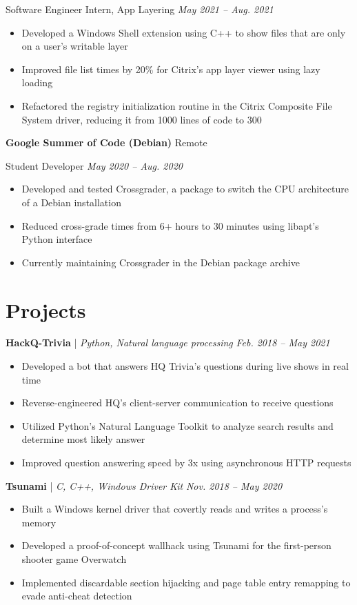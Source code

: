 \documentclass[11pt,letterpaper]{article}
\newcommand{\resumeItemListStart}{
    \begin{itemize}[itemsep=1pt, parsep=0pt, topsep=0pt]
}
\newcommand{\resumeItemListEnd}{
    \end{itemize}
}
\begin{document}
Software Engineer Intern, App Layering \hfill \textit{May 2021 -- Aug. 2021}

\resumeItemListStart
	\item Developed a Windows Shell extension using C++ to show files that are only on a user's writable layer
	\item Improved file list times by 20\% for Citrix's app layer viewer using lazy loading
	\item Refactored the registry initialization routine in the Citrix Composite File System driver, reducing it from 1000 lines of code to 300
\resumeItemListEnd

\textbf{Google Summer of Code (Debian)} \hfill Remote

Student Developer \hfill \textit{May 2020 -- Aug. 2020}

\resumeItemListStart
	\item Developed and tested Crossgrader, a package to switch the CPU architecture of a Debian installation
	\item Reduced cross-grade times from 6+ hours to 30 minutes using libapt's Python interface
    \item Currently maintaining Crossgrader in the Debian package archive
\resumeItemListEnd

\section{Projects}

\textbf{HackQ-Trivia} | \emph{Python, Natural language processing} \hfill \textit{Feb. 2018 -- May 2021}

\resumeItemListStart
    \item Developed a bot that answers HQ Trivia's questions during live shows in real time
	\item Reverse-engineered HQ's client-server communication to receive questions
	\item Utilized Python's Natural Language Toolkit to analyze search results and determine most likely answer
	\item Improved question answering speed by 3x using asynchronous HTTP requests
\resumeItemListEnd

\textbf{Tsunami} | \emph{C, C++, Windows Driver Kit} \hfill \textit {Nov. 2018 -- May 2020}

\resumeItemListStart
    \item Built a Windows kernel driver that covertly reads and writes a process's memory
    \item Developed a proof-of-concept wallhack using Tsunami for the first-person shooter game Overwatch
	\item Implemented discardable section hijacking and page table entry remapping to evade anti-cheat detection
\resumeItemListEnd
\end{document}
